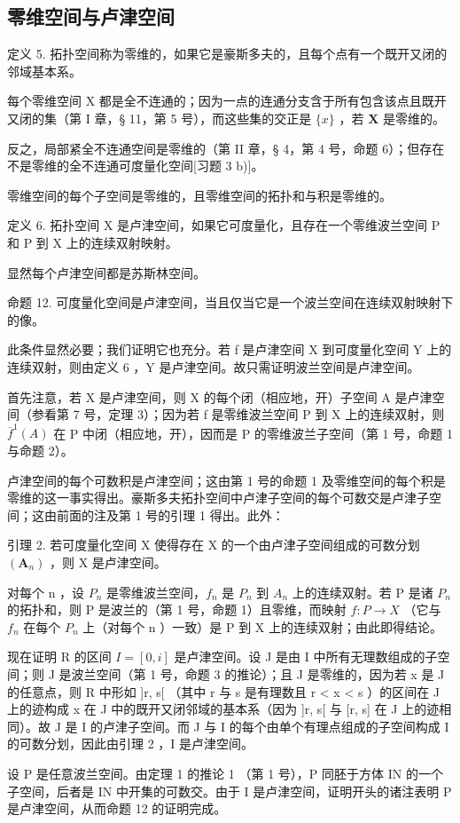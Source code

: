 \subsection{零维空间与卢津空间}

定义 5. 拓扑空间称为零维的，如果它是豪斯多夫的，且每个点有一个既开又闭的邻域基本系。

每个零维空间 X 都是全不连通的；因为一点的连通分支含于所有包含该点且既开又闭的集（第 I 章，§ 11，第 5 号），而这些集的交正是 \(\{x\}\) ，若 \(\mathbf{X}\) 是零维的。

反之，局部紧全不连通空间是零维的（第 II 章，§ 4，第 4 号，命题 6）；但存在不是零维的全不连通可度量化空间{[}习题 3 b){]}。

零维空间的每个子空间是零维的，且零维空间的拓扑和与积是零维的。

定义 6. 拓扑空间 X 是卢津空间，如果它可度量化，且存在一个零维波兰空间 P 和 P 到 X 上的连续双射映射。

显然每个卢津空间都是苏斯林空间。

命题 12. 可度量化空间是卢津空间，当且仅当它是一个波兰空间在连续双射映射下的像。

此条件显然必要；我们证明它也充分。若 f 是卢津空间 X 到可度量化空间 Y 上的连续双射，则由定义 6 ，Y 是卢津空间。故只需证明波兰空间是卢津空间。

首先注意，若 X 是卢津空间，则 X 的每个闭（相应地，开）子空间 A 是卢津空间（参看第 7 号，定理 3）；因为若 f 是零维波兰空间 P 到 X 上的连续双射，则 \(\overline{f}^{1}(A)\) 在 P 中闭（相应地，开），因而是 P 的零维波兰子空间（第 1 号，命题 1 与命题 2）。

卢津空间的每个可数积是卢津空间；这由第 1 号的命题 1 及零维空间的每个积是零维的这一事实得出。豪斯多夫拓扑空间中卢津子空间的每个可数交是卢津子空间；这由前面的注及第 1 号的引理 1 得出。此外：

引理 2. 若可度量化空间 X 使得存在 X 的一个由卢津子空间组成的可数分划 \((\mathbf{A}_{n})\) ，则 X 是卢津空间。

对每个 n ，设 \(P_{n}\) 是零维波兰空间，\(f_{n}\) 是 \(P_{n}\) 到 \(A_{n}\) 上的连续双射。若 P 是诸 \(P_{n}\) 的拓扑和，则 P 是波兰的（第 1 号，命题 1）且零维，而映射 \(f: P \to X\) （它与 \(f_{n}\) 在每个 \(P_{n}\) 上（对每个 n ）一致）是 P 到 X 上的连续双射；由此即得结论。

现在证明 R 的区间 \(I = [0, i]\) 是卢津空间。设 J 是由 I 中所有无理数组成的子空间；则 J 是波兰空间（第 1 号，命题 3 的推论）；且 J 是零维的，因为若 x 是 J 的任意点，则 R 中形如 {]}r, s{[} （其中 r 与 s 是有理数且 r \textless{} x \textless{} s ）的区间在 J 上的迹构成 x 在 J 中的既开又闭邻域的基本系（因为 {]}r, s{[} 与 {[}r, s{]} 在 J 上的迹相同）。故 J 是 I 的卢津子空间。而 J 与 I 的每个由单个有理点组成的子空间构成 I 的可数分划，因此由引理 2 ，I 是卢津空间。

设 P 是任意波兰空间。由定理 1 的推论 1 （第 1 号），P 同胚于方体 IN 的一个子空间，后者是 IN 中开集的可数交。由于 I 是卢津空间，证明开头的诸注表明 P 是卢津空间，从而命题 12 的证明完成。

